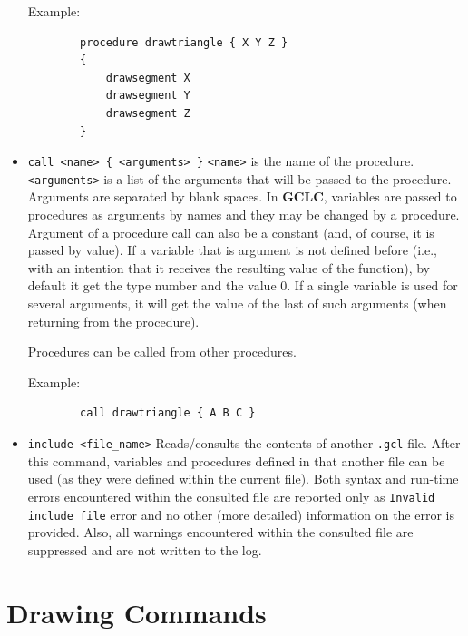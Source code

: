 \documentclass[a4paper]{book}
\newcommand{\gclc}{{\bfseries GCLC}\xspace}
\begin{document}
\begin{itemize}
        Example:

        \begin{verbatim}
        procedure drawtriangle { X Y Z }
        {
            drawsegment X
            drawsegment Y
            drawsegment Z
        }
        \end{verbatim}

\item \verb|call <name> { <arguments> }|
        \verb|<name>| is the name of the procedure. \verb|<arguments>| is
        a list of the arguments that will be passed to the procedure.
        Arguments are separated by blank spaces. In \gclc, variables are 
        passed to procedures as arguments by names and they may be changed 
        by a procedure. Argument of a procedure call can also be a constant 
        (and, of course, it is passed by value). If a variable that is 
        argument is not defined before (i.e., with an intention that it 
        receives the resulting value of the function), by default it get 
        the type {\sc number} and the value 0. If a single variable is 
        used for several arguments, it will get the value of the last of 
        such arguments (when returning from the procedure).

        Procedures can be called from other procedures.

        Example:

        \begin{verbatim}
        call drawtriangle { A B C }
        \end{verbatim}


\item \verb|include <file_name>|
        Reads/consults the contents of another \verb|.gcl| file.
        After this command, variables and procedures defined in that another
        file can be used (as they were defined within the current file).
        Both syntax and run-time errors encountered within the consulted
        file are reported only as \verb|Invalid include file|
        error and no other (more detailed) information on the error
        is provided. Also, all warnings encountered within the
        consulted file are suppressed and are not written to the log.
\end{itemize}



\section{Drawing Commands}
\end{document}
